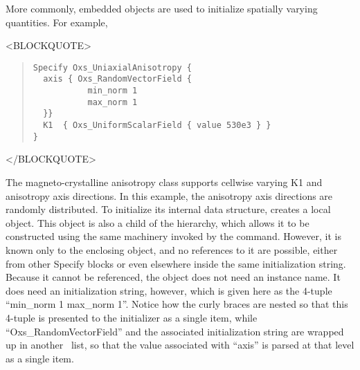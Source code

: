More commonly, embedded  objects are used to initialize
spatially varying quantities.  For
example,
\begin{rawhtml}<BLOCKQUOTE>\end{rawhtml}
\begin{quote}
\begin{verbatim}
Specify Oxs_UniaxialAnisotropy {
  axis { Oxs_RandomVectorField {
           min_norm 1
           max_norm 1
  }}
  K1  { Oxs_UniformScalarField { value 530e3 } }
}
\end{verbatim}
\end{quote}
\begin{rawhtml}</BLOCKQUOTE>\end{rawhtml}
\sloppy
The magneto-crystalline anisotropy class 
supports cellwise varying K1 and anisotropy axis directions.  In this
example, the anisotropy axis directions are randomly distributed.  To
initialize its internal data structure, 
creates a local  object.  This object is
also a child of the  hierarchy, which allows it to be
constructed using the same machinery invoked by the 
command.  However, it is known only to the enclosing
 object, and no references to it are
possible, either from other Specify blocks or even elsewhere inside
the same initialization string.  Because it cannot be referenced, the
object does not need an instance name.  It does need an initialization
string, however, which is given here as the 4-tuple ``min\_norm 1
max\_norm 1''.  Notice how the curly braces are nested so that this
4-tuple is presented to the  initializer as a
single item, while ``Oxs\_RandomVectorField'' and the associated
initialization string are wrapped up in another \Tcl\ list, so that the
value associated with ``axis'' is parsed at that level as a single item.

